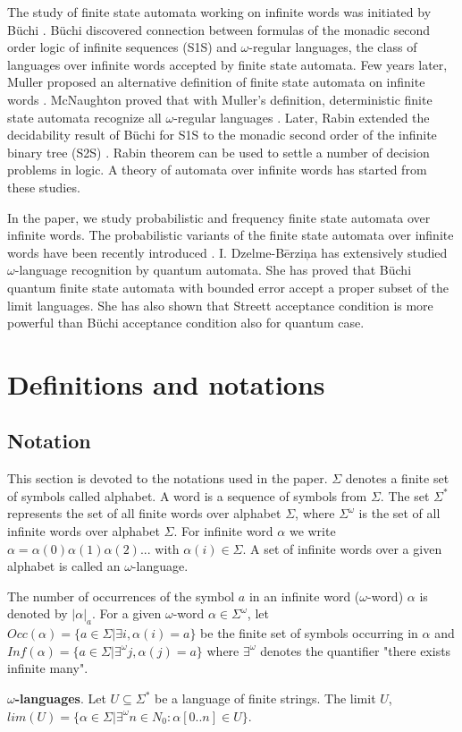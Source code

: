 \documentclass{llncs}
\begin{document}
The study of finite state automata working on infinite words was initiated by B\"uchi \cite{Bu60}. B\"uchi discovered connection between formulas of the monadic second order logic of infinite sequences (S1S) and $\omega$-regular languages, the class of languages over infinite words accepted by finite state automata. Few years later, Muller proposed an alternative definition of finite state automata on infinite words \cite{Mu63}. McNaughton proved that with Muller's definition, deterministic finite state automata recognize all $\omega$-regular languages \cite{Mc66}. Later, Rabin extended the decidability result of B\"uchi for S1S to the monadic second order of the infinite binary tree (S2S) \cite{Ra69}. Rabin theorem can be used to settle a number of decision problems in logic. A theory of automata over infinite words has started from these studies.

In the paper, we study probabilistic and frequency finite state automata over infinite words. The probabilistic variants of the finite state automata over infinite words have been recently introduced \cite{BG05}. I. Dzelme-B\= erzi\c na has extensively studied $\omega$-language recognition by quantum automata. She has proved that B\"uchi quantum finite state  automata with bounded error accept a proper subset of the limit languages. She has also shown that Streett acceptance condition is more powerful than B\"uchi acceptance condition also for quantum case. 

\section{Definitions and notations}
%
\subsection{Notation}
%
This section is devoted to the notations used in the paper. $\Sigma$ denotes a finite set of symbols called alphabet. A word is a sequence of symbols from $\Sigma$. The set $\Sigma^{*}$ represents the set of all finite words over alphabet $\Sigma$, where $\Sigma^{\omega}$ is the set of all infinite words over alphabet $\Sigma$. For infinite word $\alpha$ we write $\alpha = \alpha(0) \alpha(1) \alpha(2)...$ with $\alpha(i) \in \Sigma$. A set of infinite words over a given alphabet is called an $\omega$-language.

The number of occurrences of the symbol $a$ in an infinite word ($\omega$-word) $\alpha$ is denoted by $|\alpha|_a$. For a given $\omega$-word $\alpha \in \Sigma^{\omega}$, let $Occ(\alpha)=\{a \in \Sigma | \exists i, \alpha(i) = a\}$ be the finite set of symbols occurring in $\alpha$ and $Inf(\alpha) = \{ a \in \Sigma | \exists^\omega j, \alpha(j) = a\}$  where $\exists^\omega$ denotes the quantifier "there exists infinite many".
%
\begin{definition}
\textbf{$\omega$-languages}. Let $U \subseteq \Sigma^{*}$ be a language of finite strings. The limit $U$, $lim(U) = \{\alpha \in \Sigma | \exists^{\omega} n \in N_0: \alpha[0..n] \in U\}$.
\end{definition}
\end{document}
